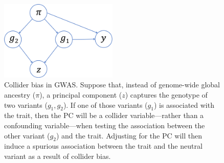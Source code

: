 \documentclass[12pt]{article}
\begin{document}
\begin{figure}
\center
\includegraphics[width=0.5\textwidth]{figs/confounding_dags/dag_collider.png}
\caption{Collider bias in GWAS. Suppose that, instead of genome-wide global ancestry ($\pi$), a principal component ($z$) captures the genotype of two variants ($g_1, g_2$). If one of those variants ($g_1$) is associated with the trait, then the PC will be a collider variable---rather than a confounding variable---when testing the association between the other variant ($g_2$) and the trait. Adjusting for the PC will then induce a spurious association between the trait and the neutral variant as a result of collider bias.}
\label{fig:collider}
\end{figure}
\end{document}
